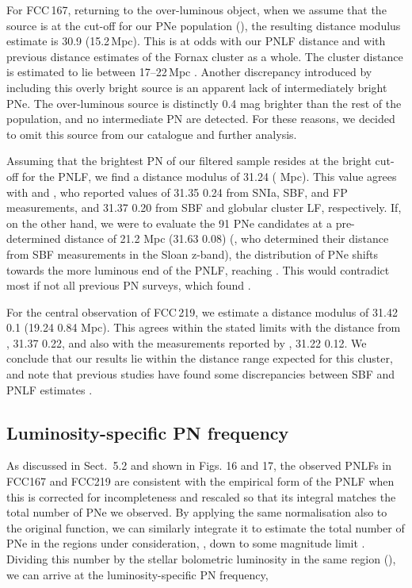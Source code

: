 \documentclass{aa}
\begin{document}
For FCC\,167, returning to the over-luminous object, when we assume that the source is at the cut-off for our PNe population (), the resulting distance modulus estimate is 30.9 (15.2\,Mpc). This is at odds with our PNLF distance and with previous distance estimates of the Fornax cluster as a whole. The cluster distance is estimated to lie between 17--22\,Mpc \citep{ferrarese_hubble_2000, blakeslee_acs_2009, tully_cosmicflows-3_2016}. Another discrepancy introduced by including this overly bright source is an apparent lack of intermediately bright PNe. The over-luminous source  is distinctly 0.4 mag brighter than the rest of the population, and no intermediate PN are detected. For these reasons, we decided to omit this source from our catalogue and further analysis.

Assuming that the brightest PN of our filtered sample resides at the bright cut-off for the PNLF, we find a distance modulus of 31.24 ( Mpc). This value agrees with \citet{tully_cosmicflows-3_2016} and \citet{ferrarese_hubble_2000}, who reported values of 31.35  0.24 from SNIa, SBF, and FP measurements, and 31.37  0.20 from SBF and globular cluster LF, respectively. If, on the other hand, we were to evaluate the 91 PNe candidates at a pre-determined distance of 21.2 Mpc (31.63  0.08) (\citep{blakeslee_acs_2009}, who determined their distance from SBF measurements in the Sloan z-band), the distribution of PNe shifts towards the more luminous end of the PNLF, reaching . This would contradict most if not all previous PN surveys, which found .

For the central observation of FCC\,219, we estimate a distance modulus of 31.42  0.1 (19.24  0.84 Mpc). This agrees within the stated limits with the distance from \citet{tully_cosmicflows-3_2016}, 31.37  0.22, and also with the measurements reported by \citet{ferrarese_hubble_2000}, 31.22  0.12. We conclude that our results lie within the distance range expected for this cluster, and note that previous studies have found some discrepancies between SBF and PNLF estimates \citep{ciardullo_planetary_2012, kreckel_revised_2017}.

\subsection{Luminosity-specific PN frequency}

As discussed in Sect.~5.2 and shown in Figs. 16 and 17, the observed PNLFs in FCC167 and FCC219 are consistent with the \citet{ciardullo_planetary_1989} empirical form of the PNLF when this is corrected for incompleteness and rescaled so that its integral matches the total number of PNe we observed. By applying the same normalisation also to the original function, we can similarly integrate it to estimate the total number of PNe in the regions under consideration,  , down to some magnitude limit . Dividing this number by the stellar bolometric luminosity in the same region (), we can arrive at the luminosity-specific PN frequency,
\end{document}
